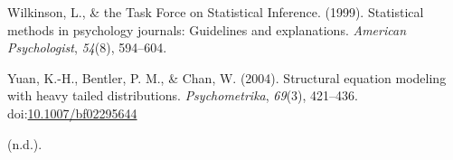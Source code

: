 \documentclass[man]{apa6}
\begin{document}
\leavevmode\hypertarget{ref-Wilkinson_1999}{}%
Wilkinson, L., \& the Task Force on Statistical Inference. (1999). Statistical methods in psychology journals: Guidelines and explanations. \emph{American Psychologist}, \emph{54}(8), 594--604.

\leavevmode\hypertarget{ref-Yuan_et_al_2004}{}%
Yuan, K.-H., Bentler, P. M., \& Chan, W. (2004). Structural equation modeling with heavy tailed distributions. \emph{Psychometrika}, \emph{69}(3), 421--436. doi:\href{https://doi.org/10.1007/bf02295644}{10.1007/bf02295644}

\leavevmode\hypertarget{ref-Keselman_et_al_2008}{}%
(n.d.).
\end{document}
